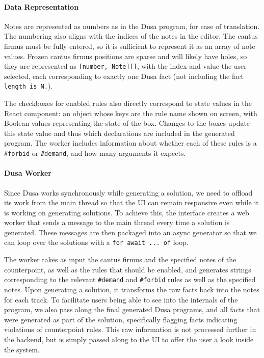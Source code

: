 \paragraph{Data Representation}

Notes are represented as numbers as in the Dusa program, for ease
of translation. The numbering also aligns with the indices of the notes in the
editor. The cantus firmus must be fully entered, so it is sufficient to
represent it as an array of note values. Frozen cantus firmus positions are
sparse and will likely have holes, so they are represented as
\verb|[number, Note][]|, with the index and value the user selected, each
corresponding to exactly one Dusa fact (not including the fact \verb|length is N.|).

The checkboxes for enabled rules also directly correspond to state values in the
React component: an object whose keys are the rule name shown on screen, with
Boolean values representing the state of the box. Changes to the boxes update
this state value and thus which declarations are included in the generated program.
The worker includes information about whether each of these rules is a
\verb|#forbid| or \verb|#demand|, and how many arguments it expects.

\paragraph{Dusa Worker}
Since Dusa works synchronously while generating a solution, we need to offload
its work from the main thread so that the UI can remain responsive even while
it is working on generating solutions. To achieve this, the interface creates a web worker
that sends a message to the main thread every time a solution is generated.
These messages are then packaged into an async generator so that we can loop
over the solutions with a \verb|for await ... of| loop.

The worker takes as input the cantus firmus and the specified notes of the
counterpoint, as well as the rules that should be enabled, and generates strings
corresponding to the relevant \verb|#demand| and \verb|#forbid| rules as well as
the specified notes. Upon generating a solution, it transforms the raw
facts back into the notes for each track. To facilitate users being able to
see into the internals of the program, we also pass along the final generated
Dusa programs, and all facts that were generated as part of the solution,
specifically flagging facts indicating violations of counterpoint rules.
This raw information is not processed further in the backend, but is simply passed along to the
UI to offer the user a look inside the system.

